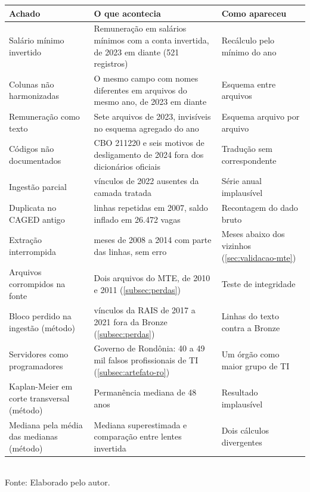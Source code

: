 \begin{quadro}[htbp]
    \centering
    \caption{Defeitos de dado e de método encontrados durante a construção}
    \label{quadro:achados}
    \footnotesize
    \renewcommand{\arraystretch}{1.1}
    \begin{tabularx}{\textwidth}{%
        >{\raggedright\arraybackslash\hsize=0.80\hsize}X
        >{\raggedright\arraybackslash\hsize=1.35\hsize}X
        >{\raggedright\arraybackslash\hsize=0.85\hsize}X}
        \toprule
        \rowcolor{black!8}
        \textbf{Achado} & \textbf{O que acontecia} & \textbf{Como apareceu} \\
        \midrule
        Salário mínimo invertido & Remuneração em salários mínimos com a conta invertida, de 2023 em diante (521 registros) & Recálculo pelo mínimo do ano \\ \addlinespace[4pt]
        Colunas não harmonizadas & O mesmo campo com nomes diferentes em arquivos do mesmo ano, de 2023 em diante & Esquema entre arquivos \\ \addlinespace[4pt]
        Remuneração como texto & Sete arquivos de 2023, invisíveis no esquema agregado do ano & Esquema arquivo por arquivo \\ \addlinespace[4pt]
        Códigos não documentados & CBO 211220 e seis motivos de desligamento de 2024 fora dos dicionários oficiais & Tradução sem correspondente \\ \addlinespace[4pt]
        Ingestão parcial & 446.267 vínculos de 2022 ausentes da camada tratada & Série anual implausível \\ \addlinespace[4pt]
        Duplicata no CAGED antigo & 206.950 linhas repetidas em 2007, saldo inflado em 26.472 vagas & Recontagem do dado bruto \\ \addlinespace[4pt]
        Extração interrompida & 21 meses de 2008 a 2014 com parte das linhas, sem erro & Meses abaixo dos vizinhos (\autoref{sec:validacao-mte}) \\ \addlinespace[4pt]
        Arquivos corrompidos na fonte & Dois arquivos do MTE, de 2010 e 2011 (\autoref{subsec:perdas}) & Teste de integridade \\ \addlinespace[4pt]
        Bloco perdido na ingestão (método) & 567.751 vínculos da RAIS de 2017 a 2021 fora da Bronze (\autoref{subsec:perdas}) & Linhas do texto contra a Bronze \\ \addlinespace[4pt]
        Servidores como programadores & Governo de Rondônia: 40 a 49 mil falsos profissionais de TI (\autoref{subsec:artefato-ro}) & Um órgão como maior grupo de TI \\ \addlinespace[4pt]
        Kaplan-Meier em corte transversal (método) & Permanência mediana de 48 anos & Resultado implausível \\ \addlinespace[4pt]
        Mediana pela média das medianas (método) & Mediana superestimada e comparação entre lentes invertida & Dois cálculos divergentes \\
        \bottomrule
    \end{tabularx}
    \\[4pt]
    {\footnotesize Fonte: Elaborado pelo autor.}
\end{quadro}


